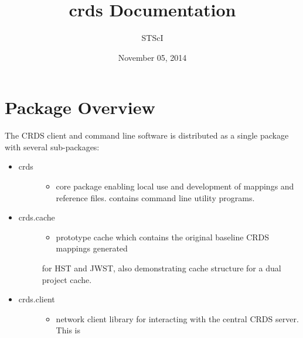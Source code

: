 \documentclass[letterpaper,10pt,english]{sphinxmanual}
\title{crds Documentation}
\date{November 05, 2014}
\author{STScI}
\begin{document}
\maketitle
\tableofcontents
{}\label{index::doc}



\chapter{Package Overview}
\label{installation:package-overview}\label{installation:crds-user-manual}\label{installation::doc}
The CRDS client and command line software is distributed as a single package with
several sub-packages:
\begin{itemize}
\item {} \begin{description}
\item[{crds}] \leavevmode\begin{itemize}
\item {} 
core package enabling local use and development of mappings
and reference files.  contains command line utility programs.

\end{itemize}

\end{description}

\item {} \begin{description}
\item[{crds.cache}] \leavevmode\begin{itemize}
\item {} 
prototype cache which contains the original baseline CRDS mappings generated

\end{itemize}

for HST and JWST,  also demonstrating cache structure for a dual project cache.

\end{description}

\item {} \begin{description}
\item[{crds.client}] \leavevmode\begin{itemize}
\item {} 
network client library for interacting with the central CRDS server.  This is

\end{itemize}


\end{description}
\end{itemize}
\end{document}
